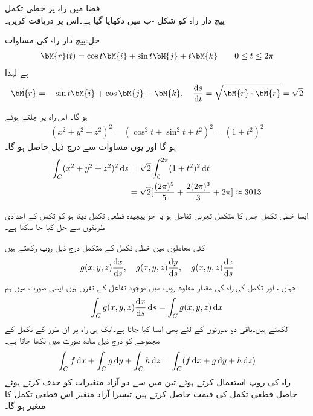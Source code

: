 \quad فضا میں راہ پر خطی تکمل\\
پیچ دار راہ کو شکل -ب میں دکھایا گیا ہے۔اس پر  دریافت کریں۔

حل:پیچ دار راہ کی مساوات 
\begin{align*}
\bM{r}(t)=\cos t\bM{i}+\sin t\bM{j}+t\bM{k}\quad \quad 0\le t \le 2\pi
\end{align*}
ہے لہٰذا
\begin{align*}
 \dot{\bM{r}}=-\sin t\bM{i}+\cos \bM{j}+\bM{k},\quad \frac{\dif s}{\dif t}=\sqrt{\dot{\bM{r}}\cdot \dot{\bM{r}}}=\sqrt{2}
\end{align*}

 ہو گا۔  اس راہ پر چلتے ہوئے 
\begin{align*}
(x^2+y^2+z^2)^2=(\cos^2 t+\sin^2 t+t^2)^2=(1+t^2)^2
\end{align*}
ہو گا اور یوں مساوات  سے درج ذیل حاصل ہو گا۔
\begin{align*}
\int_C (x^2+y^2+z^2)^2\dif s&=\sqrt{2}\int_0^{2\pi} (1+t^2)^2\dif t\\
&=\sqrt{2}[\frac{(2\pi)^5}{5}+\frac{2(2\pi)^3}{3}+2\pi]\approx 3013
\end{align*}

ایسا خطی تکمل جس کا متکمل تجربی تفاعل ہو یا جو پیچیدہ قطعی تکمل دیتا ہو کو تکمل کے اعدادی طریقوں سے حل کیا جا سکتا ہے۔   

کئی معاملوں میں خطی تکمل کے متکمل درج ذیل روپ رکھتے ہیں
\begin{align}
g(x,y,z)\frac{\dif x}{\dif s},\quad g(x,y,z)\frac{\dif y}{\dif s},\quad g(x,y,z)\frac{\dif z}{\dif s}
\end{align}
جہاں ،  اور  تکمل کی راہ کی مقدار معلوم روپ میں موجود تفاعل کے تفرق ہیں۔ایسی صورت میں ہم
\begin{align}\label{مساوات_خطی_تکمل_کئی_آزاد_الف}
\int_C g(x,y,z)\frac{\dif x}{\dif s}\dif s=\int_C g(x,y,z)\dif x
\end{align}
لکھتے ہیں۔باقی دو صورتوں کے لئے بھی ایسا کیا جاتا ہے۔ایک ہی راہ  پر ان طرز کے تکمل کے مجموعے کو درج ذیل سادہ صورت میں لکھا جاتا ہے۔
\begin{align}\label{مساوات_خطی_تکمل_کئی_آزاد_ب}
\int_C f\dif x+\int_C g\dif y+\int_C h\dif z=\int_C (f\dif x+g\dif y+h\dif z)
\end{align}
راہ  کی روپ استعمال کرتے ہوئے تین میں سے دو آزاد متغیرات کو حذف کرتے ہوئے حاصل قطعی تکمل کی قیمت حاصل کرتے ہیں۔تیسرا آزاد متغیر اس قطعی تکمل کا متغیر ہو گا۔

